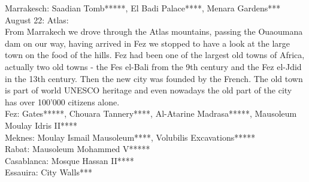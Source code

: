 Marrakesch: Saadian Tomb*****, El Badi Palace****, Menara Gardens***\\

August 22: Atlas:\\
From Marrakech we drove through the Atlas mountains, passing the Ouaoumana dam on our way, having arrived in Fez we stopped to have a look at the large town on the food of the hills. Fez had been one of the largest old towns of Africa, actually two old towns - the Fes el-Bali from the 9th century and the Fez el-Jdid in the 13th century. Then the new city was founded by the French. The old town is part of world UNESCO heritage and even nowadays the old part of the city has over 100'000 citizens alone. \\

Fez: Gates*****, Chouara Tannery****, Al-Atarine Madrasa*****, Mausoleum Moulay Idris II****\\
Meknes: Moulay Ismail Mausoleum****, Volubilis Excavations*****\\
Rabat: Mausoleum Mohammed V*****\\
Casablanca: Mosque Hassan II****\\
Essauira: City Walls***
